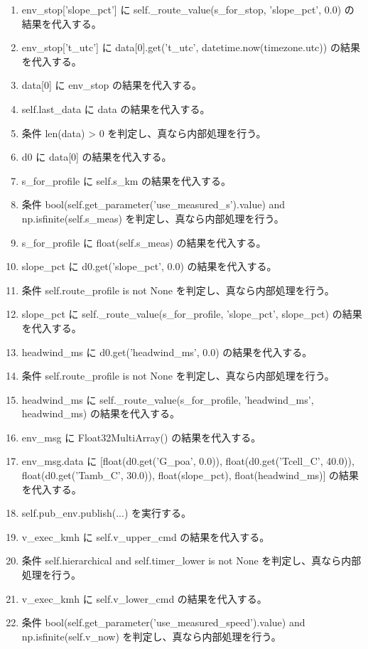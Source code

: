 \documentclass[a4paper,11pt]{article}
\begin{document}
\begin{enumerate}[leftmargin=1.8em]
\item   env\_stop['slope\_pct'] に self.\_route\_value(s\_for\_stop, 'slope\_pct', 0.0) の結果を代入する。
\item   env\_stop['t\_utc'] に data[0].get('t\_utc', datetime.now(timezone.utc)) の結果を代入する。
\item   data[0] に env\_stop の結果を代入する。
\item self.last\_data に data の結果を代入する。
\item 条件 len(data) > 0 を判定し、真なら内部処理を行う。
\item   d0 に data[0] の結果を代入する。
\item   s\_for\_profile に self.s\_km の結果を代入する。
\item   条件 bool(self.get\_parameter('use\_measured\_s').value) and np.isfinite(self.s\_meas) を判定し、真なら内部処理を行う。
\item     s\_for\_profile に float(self.s\_meas) の結果を代入する。
\item   slope\_pct に d0.get('slope\_pct', 0.0) の結果を代入する。
\item   条件 self.route\_profile is not None を判定し、真なら内部処理を行う。
\item     slope\_pct に self.\_route\_value(s\_for\_profile, 'slope\_pct', slope\_pct) の結果を代入する。
\item   headwind\_ms に d0.get('headwind\_ms', 0.0) の結果を代入する。
\item   条件 self.route\_profile is not None を判定し、真なら内部処理を行う。
\item     headwind\_ms に self.\_route\_value(s\_for\_profile, 'headwind\_ms', headwind\_ms) の結果を代入する。
\item   env\_msg に Float32MultiArray() の結果を代入する。
\item   env\_msg.data に [float(d0.get('G\_poa', 0.0)), float(d0.get('Tcell\_C', 40.0)), float(d0.get('Tamb\_C', 30.0)), float(slope\_pct), float(headwind\_ms)] の結果を代入する。
\item   self.pub\_env.publish(...) を実行する。
\item   v\_exec\_kmh に self.v\_upper\_cmd の結果を代入する。
\item   条件 self.hierarchical and self.timer\_lower is not None を判定し、真なら内部処理を行う。
\item     v\_exec\_kmh に self.v\_lower\_cmd の結果を代入する。
\item   条件 bool(self.get\_parameter('use\_measured\_speed').value) and np.isfinite(self.v\_now) を判定し、真なら内部処理を行う。

\end{enumerate}
\end{document}
